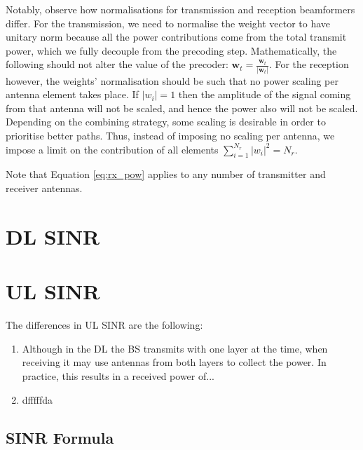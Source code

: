 Notably, observe how normalisations for transmission and reception beamformers differ. For the transmission, we need to normalise the weight vector to have unitary norm because all the power contributions come from the total transmit power, which we fully decouple from the precoding step. Mathematically, the following should not alter the value of the precoder: $\bm{w}_t = \frac{\bm{w}_t}{\left|\bm{w}_t\right|}$. For the reception however, the weights' normalisation should be such that no power scaling per antenna element takes place. If $|w_i| = 1$ then the amplitude of the signal coming from that antenna will not be scaled, and hence the power also will not be scaled. Depending on the combining strategy, some scaling is desirable in order to prioritise better paths. Thus, instead of imposing no scaling per antenna, we impose a limit on the contribution of all elements $\sum_{i=1}^{N_r} |w_i|^2 = N_r$.


Note that Equation \eqref{eq:rx_pow} applies to any number of transmitter and receiver antennas.





\section{DL SINR}




\section{UL SINR}

The differences in UL SINR are the following:
\begin{enumerate}
    \item Although in the DL the BS transmits with one layer at the time, when receiving it may use antennas from both layers to collect the power. In practice, this results in a received power of...
    \item dfffffda
\end{enumerate}













\subsection{SINR Formula}

